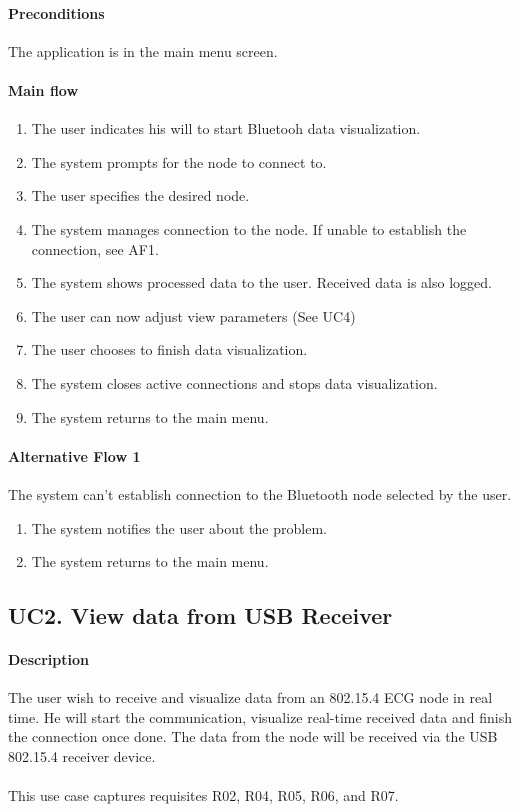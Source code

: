 			\paragraph{Preconditions} The application is in the main menu screen.
			\paragraph{Main flow}
				\begin{enumerate}
				\item The user indicates his will to start Bluetooh data visualization.
				\item The system prompts for the node to connect to.
				\item The user specifies the desired node.
				\item The system manages connection to the node. If unable to establish the connection, see AF1.
				\item The system shows processed data to the user. Received data is also logged.
				\item The user can now adjust view parameters (See UC4)
				\item The user chooses to finish data visualization.
				\item The system closes active connections and stops data visualization.
				\item The system returns to the main menu.
				\end{enumerate}

			\paragraph{Alternative Flow 1} The system can't establish connection to the Bluetooth node selected by the user.
				\begin{enumerate}
				\item The system notifies the user about the problem.
				\item The system returns to the main menu.
				\end{enumerate}

		\subsection{UC2. View data from USB Receiver}

			\paragraph{Description} The user wish to receive and visualize data from 	an 802.15.4 ECG node in real time. He will start the communication, visualize real-time received data and finish the connection once done. The data from the node will be received via the USB 802.15.4 receiver device.\\
			\\This use case captures requisites R02, R04, R05, R06, and R07.

